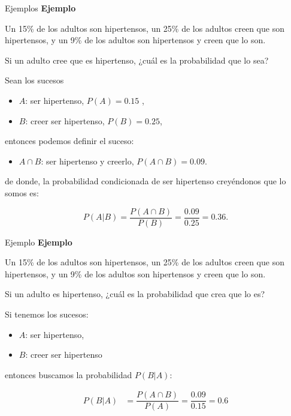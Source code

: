\documentclass[
  ignorenonframetext,
]{beamer}
\providecommand{\tightlist}{%
  \setlength{\itemsep}{0pt}\setlength{\parskip}{0pt}}
\begin{document}
\begin{frame}{Ejemplos}
\protect\hypertarget{ejemplos}{}
\textbf{Ejemplo}

Un 15\% de los adultos son hipertensos, un 25\% de los adultos creen que
son hipertensos, y un 9\% de los adultos son hipertensos y creen que lo
son.

Si un adulto cree que es hipertenso, ¿cuál es la probabilidad que lo
sea?

Sean los sucesos

\begin{itemize}
\tightlist
\item
  \(A\): ser hipertenso, \(P(A)=0.15\) ,
\item
  \(B\): creer ser hipertenso, \(P(B)=0.25\),
\end{itemize}

entonces podemos definir el suceso:

\begin{itemize}
\tightlist
\item
  \(A\cap B\): ser hipertenso y creerlo, \(P(A\cap B)=0.09\).
\end{itemize}

de donde, la probabilidad condicionada de ser hipertenso creyéndonos que
lo somos es:

\[P(A|B)=\dfrac{P(A\cap B)}{P(B)}=\dfrac{0.09}{0.25}=0.36.\]
\end{frame}

\begin{frame}{Ejemplo}
\protect\hypertarget{ejemplo-1}{}
\textbf{Ejemplo}

Un 15\% de los adultos son hipertensos, un 25\% de los adultos creen que
son hipertensos, y un 9\% de los adultos son hipertensos y creen que lo
son.

Si un adulto es hipertenso, ¿cuál es la probabilidad que crea que lo es?

Si tenemos los sucesos:

\begin{itemize}
\tightlist
\item
  \(A\): ser hipertenso,
\item
  \(B\): creer ser hipertenso
\end{itemize}

entonces buscamos la probabilidad \(P(B|A)\):

\[
\begin{array}{rl}
P(B|A) & =\dfrac{P(A\cap B)}{P(A)}=\dfrac{0.09}{0.15}=
0.6
\end{array}
\]
\end{frame}
\end{document}
